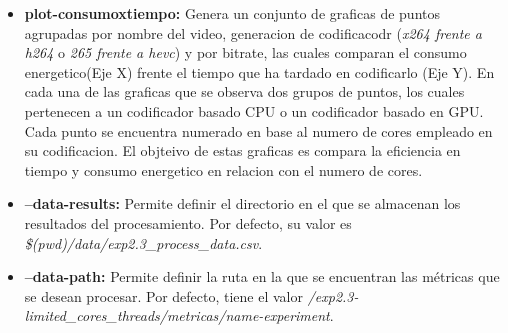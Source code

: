 \begin{itemize}
 \item \textbf{plot-consumoxtiempo:} Genera un conjunto de graficas de puntos agrupadas por nombre del video, generacion de codificacodr (\textit{x264 frente a h264} o \textit{265 frente a hevc}) y por bitrate, las cuales comparan el consumo energetico(Eje X) frente el tiempo que ha tardado en codificarlo (Eje Y). En cada una de las graficas que se observa dos grupos de puntos, los cuales pertenecen a un codificador basado CPU o un codificador basado en GPU. Cada punto se encuentra numerado en base al numero de cores empleado en su codificacion. El objteivo de estas graficas es compara la eficiencia en tiempo y consumo energetico en relacion con el numero de cores.
 
 \item \textbf{--data-results:} Permite definir el directorio en el que se almacenan los resultados del procesamiento. Por defecto, su valor es \textit{\$(pwd)/data/exp2.3\_process\_data.csv}.
 
 \item \textbf{--data-path:} Permite definir la ruta en la que se encuentran las métricas que se desean procesar. Por defecto, tiene el valor \textit{/exp2.3-limited\_cores\_threads/metricas/name-experiment}.
\end{itemize}
